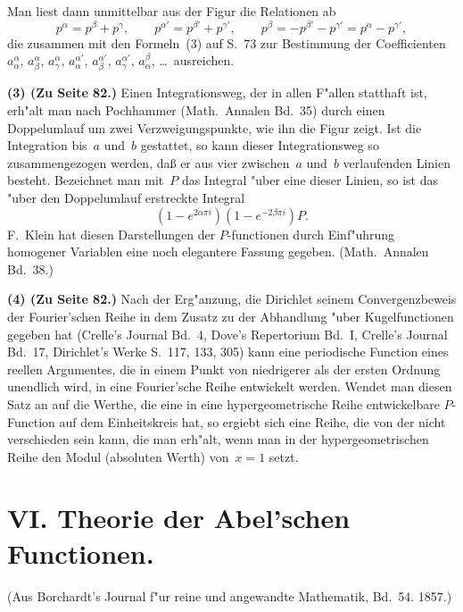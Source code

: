 \documentclass[12pt,a4paper]{article}
\begin{document}
Man liest dann unmittelbar aus der Figur die Relationen ab
\[
p^\alpha = p^\beta + p^\gamma,\qquad
p^{\alpha'} = p^{\beta'} + p^{\gamma'},\qquad
p^\beta = -p^{\beta'} - p^{\gamma'} = p^\alpha - p^{\gamma'},
\]
die zusammen mit den Formeln~(3) auf S.~73 zur Bestimmung der
Coefficienten $a_\alpha^\alpha$, $a_\beta^\alpha$, $a_\gamma^\alpha$, $a_\alpha^{\alpha'}$,
$a_\beta^{\alpha'}$, $a_\gamma^{\alpha'}$, $a_\alpha^\beta$, \ldots\ ausreichen.

\textbf{(3) (Zu Seite 82.)} Einen Integrationsweg, der in allen F"allen
statthaft ist, erh"alt man nach Pochhammer (Math.\ Annalen Bd.~35)
durch einen Doppelumlauf um zwei Verzweigungspunkte, wie ihn die
Figur zeigt. Ist die Integration bis~$a$ und~$b$ gestattet, so kann
dieser Integrationsweg so zusammengezogen werden, da\ss{} er aus vier
zwischen~$a$ und~$b$ verlaufenden Linien besteht. Bezeichnet man mit~$P$
das Integral "uber eine dieser Linien, so ist das "uber den Doppelumlauf
erstreckte Integral
\[
(1 - e^{2\alpha\pi i})(1 - e^{-2\beta\pi i})P.
\]
F.\ Klein hat diesen Darstellungen der $P$-functionen durch Einf"uhrung
homogener Variablen eine noch elegantere Fassung gegeben.
(Math.\ Annalen Bd.~38.)

\textbf{(4) (Zu Seite 82.)} Nach der Erg"anzung, die Dirichlet seinem
Convergenzbeweis der Fourier'schen Reihe in dem Zusatz zu der
Abhandlung "uber Kugelfunctionen gegeben hat (Crelle's Journal
Bd.~4, Dove's Repertorium Bd.~I, Crelle's Journal Bd.~17, Dirichlet's
Werke S.~117, 133, 305) kann eine periodische Function eines reellen
Argumentes, die in einem Punkt von niedrigerer als der ersten Ordnung
unendlich wird, in eine Fourier'sche Reihe entwickelt werden. Wendet
man diesen Satz an auf die Werthe, die eine in eine hypergeometrische
Reihe entwickelbare $P$-Function auf dem Einheitskreis hat, so ergiebt
sich eine Reihe, die von der nicht verschieden sein kann, die man erh"alt,
wenn man in der hypergeometrischen Reihe den Modul (absoluten Werth)
von~$x = 1$ setzt.

\newpage
\section*{VI. Theorie der Abel'schen Functionen.}
\label{sec:abel}

\begin{center}
(Aus Borchardt's Journal f"ur reine und angewandte Mathematik, Bd.~54. 1857.)
\end{center}
\end{document}
